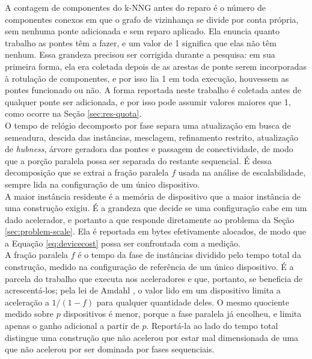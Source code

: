 A contagem de componentes do \ac{k-NNG} antes do reparo é o número de componentes conexos em que o grafo de vizinhança se divide por conta própria, sem nenhuma ponte adicionada e sem reparo aplicado. Ela enuncia quanto trabalho as pontes têm a fazer, e um valor de 1 significa que elas não têm nenhum. Essa grandeza precisou ser corrigida durante a pesquisa: em sua primeira forma, ela era coletada depois de as arestas de ponte serem incorporadas à rotulação de componentes, e por isso lia 1 em toda execução, houvessem as pontes funcionado ou não. A forma reportada neste trabalho é coletada antes de qualquer ponte ser adicionada, e por isso pode assumir valores maiores que 1, como ocorre na Seção \ref{sec:res-quota}.\\

O tempo de relógio decomposto por fase separa uma atualização em busca de semeadura, descida das instâncias, mesclagem, refinamento restrito, atualização de \textit{hubness}, árvore geradora das pontes e passagem de conectividade, de modo que a porção paralela possa ser separada do restante sequencial. É dessa decomposição que se extrai a fração paralela $f$ usada na análise de escalabilidade, sempre lida na configuração de um único dispositivo.\\

A maior instância residente é a memória de dispositivo que a maior instância de uma construção exigiu. É a grandeza que decide se uma configuração cabe em um dado acelerador, e portanto a que responde diretamente ao problema da Seção \ref{sec:problem-scale}. Ela é reportada em bytes efetivamente alocados, de modo que a Equação \eqref{eq:devicecost} possa ser confrontada com a medição.\\

A fração paralela $f$ é o tempo da fase de instâncias dividido pelo tempo total da construção, medido na configuração de referência de um único dispositivo. É a parcela do trabalho que executa nos aceleradores e que, portanto, se beneficia de acrescentá-los; pela lei de Amdahl \cite{amdahl}, o valor lido em um dispositivo limita a aceleração a $1/(1-f)$ para qualquer quantidade deles. O mesmo quociente medido sobre $p$ dispositivos é menor, porque a fase paralela já encolheu, e limita apenas o ganho adicional a partir de $p$. Reportá-la ao lado do tempo total distingue uma construção que não acelerou por estar mal dimensionada de uma que não acelerou por ser dominada por fases sequenciais.\\

